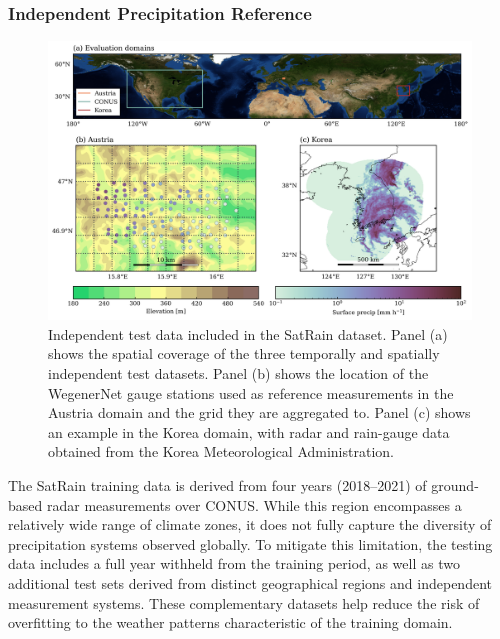 \documentclass[11pt]{article}
\begin{document}
\subsubsection{Independent Precipitation Reference}

\begin{figure}[htbp] %
	\centering
	\includegraphics[width=1.0\textwidth]{figures/fig06}
	\caption{
		Independent test data included in the SatRain dataset. Panel (a) shows the
		spatial coverage of the three temporally and spatially independent test
		datasets. Panel (b) shows the location of the WegenerNet gauge stations used as
		reference measurements in the Austria domain and the grid they are aggregated
		to. Panel (c) shows an example in the Korea domain, with radar and rain-gauge
		data obtained from the Korea Meteorological Administration.
	}
	\label{fig:observations_geo}
\end{figure}

The SatRain training data is derived from four years (2018–2021) of ground-based
radar measurements over CONUS. While this region encompasses a relatively wide
range of climate zones, it does not fully capture the diversity of precipitation
systems observed globally. To mitigate this limitation, the testing data
includes a full year withheld from the training period, as well as two
additional test sets derived from distinct geographical regions and independent
measurement systems. These complementary datasets help reduce the risk of
overfitting to the weather patterns characteristic of the training domain.
\end{document}
